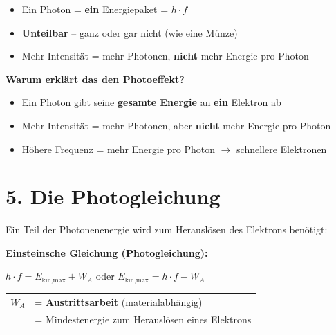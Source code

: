 \documentclass[11pt,a4paper]{article}
\begin{document}
\begin{tcolorbox}[infobox={Kernidee: Energie ist gequantelt!}]
\begin{itemize}[nosep]
\item Ein Photon = \textbf{ein} Energiepaket = $h \cdot f$
\item \textbf{Unteilbar} -- ganz oder gar nicht (wie eine Münze)
\item Mehr Intensität = mehr Photonen, \textbf{nicht} mehr Energie pro Photon
\end{itemize}
\end{tcolorbox}

\textbf{Warum erklärt das den Photoeffekt?}

\begin{itemize}[nosep]
\item Ein Photon gibt seine \textbf{gesamte Energie} an \textbf{ein} Elektron ab
\item Mehr Intensität = mehr Photonen, aber \textbf{nicht} mehr Energie pro Photon
\item Höhere Frequenz = mehr Energie pro Photon $\rightarrow$ schnellere Elektronen
\end{itemize}


\section*{5. Die Photogleichung}

Ein Teil der Photonenenergie wird zum Herauslösen des Elektrons benötigt:

\begin{tcolorbox}[merksatz]
\textbf{Einsteinsche Gleichung (Photogleichung):}

\vspace{0.5em}
\hfill $\boxed{h \cdot f = E_{\text{kin,max}} + W_A}$ \hfill oder \hfill $\boxed{E_{\text{kin,max}} = h \cdot f - W_A}$ \hfill\mbox{}
\vspace{0.5em}

\begin{tabular}{ll}
$W_A$ & = \textbf{Austrittsarbeit} (materialabhängig) \\
& = Mindestenergie zum Herauslösen eines Elektrons \\
\end{tabular}
\end{tcolorbox}
\end{document}
